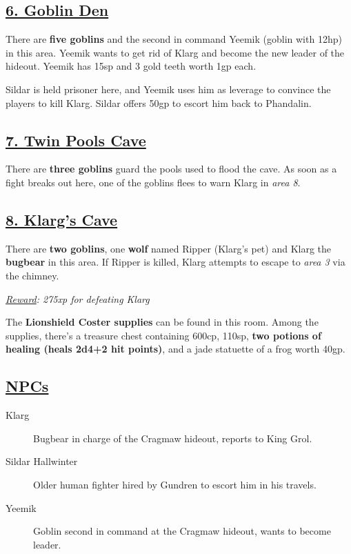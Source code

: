 \subsection*{\underline{6. Goblin Den}}
There are \textbf{five goblins} and the second in command Yeemik (goblin with 12hp) in this area. Yeemik wants to get rid of Klarg and become the new leader of the hideout. Yeemik has 15sp and 3 gold teeth worth 1gp each. 

Sildar is held prisoner here, and Yeemik uses him as leverage to convince the players to kill Klarg. Sildar offers 50gp to escort him back to Phandalin.

\subsection*{\underline{7. Twin Pools Cave}}
There are \textbf{three goblins} guard the pools used to flood the cave. As soon as a fight breaks out here, one of the goblins flees to warn Klarg in \emph{area 8}.

\subsection*{\underline{8. Klarg's Cave}}
There are \textbf{two goblins}, one \textbf{wolf} named Ripper (Klarg's pet) and Klarg the \textbf{bugbear} in this area. If Ripper is killed, Klarg attempts to escape to \emph{area 3} via the chimney.

\emph{\underline{Reward}: 275xp for defeating Klarg} 

The \textbf{Lionshield Coster supplies} can be found in this room. Among the supplies, there's a treasure chest containing 600cp, 110sp, \textbf{two potions of healing (heals 2d4+2 hit points)}, and a jade statuette of a frog worth 40gp.

\subsection*{\underline{NPCs}}
\begin{description}
	\item[Klarg] Bugbear in charge of the Cragmaw hideout, reports to King Grol.
	\item[Sildar Hallwinter] Older human fighter hired by Gundren to escort him in his travels.
	\item[Yeemik] Goblin second in command at the Cragmaw hideout, wants to become leader.
\end{description}